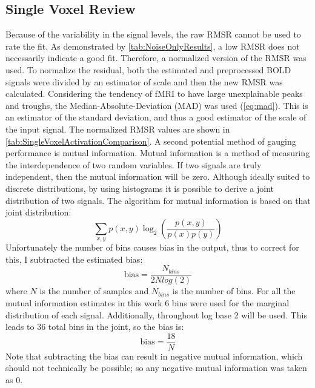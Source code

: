 \subsection{Single Voxel Review}
\label{sec:SingleVoxelReview}
Because of the variability in the signal levels, the
raw \ac{RMSR} cannot be used to rate the fit. As demonstrated by \autoref{tab:NoiseOnlyResults},
a low \ac{RMSR} does not necessarily indicate a good fit.
Therefore, a normalized version of the \ac{RMSR} was used. To normalize the
residual, both the estimated and preprocessed \ac{BOLD} signals were divided by an estimator
of scale and then the new \ac{RMSR} was calculated.
Considering the tendency of \ac{fMRI} to have large unexplainable
peaks and troughs, the Median-Absolute-Deviation (MAD) was used (\autoref{eq:mad}).
This is an estimator of the standard
deviation, and thus a good estimator of the scale of the input signal.
The normalized \ac{RMSR} values are
shown in \autoref{tab:SingleVoxelActivationComparison}. A second potential method of
gauging performance is mutual information. Mutual information is a method of measuring
the interdependence of two random variables. If two signals are truly independent,
then the mutual information will be zero. Although ideally suited to discrete
distributions, by using histograms
it is possible to derive a joint distribution of two signals. The algorithm for
mutual information is based on that joint distribution:
\begin{equation}
\sum_{x,y} p(x,y) \log_2\left(\frac{p(x,y)}{p(x)p(y)}\right)
\end{equation}
Unfortunately the number of bins causes bias in the output, thus to correct for this,
I subtracted the estimated bias:
\begin{equation}
\text{bias} = \frac{N_{bins}}{2Nlog(2)}
\end{equation}
where $N$ is the number of samples and $N_{bins}$ is the number of bins. For all
the mutual information estimates in this work 6 bins were used for the marginal
distribution of each signal. Additionally, throughout log base 2 will be used.
This leads to 36 total bins in the joint, so the bias is:
\begin{equation}
\text{bias} = \frac{18}{N}
\end{equation}
 Note that subtracting the bias can result in negative mutual
information, which should not technically be possible; so any negative mutual information
was taken as 0.

